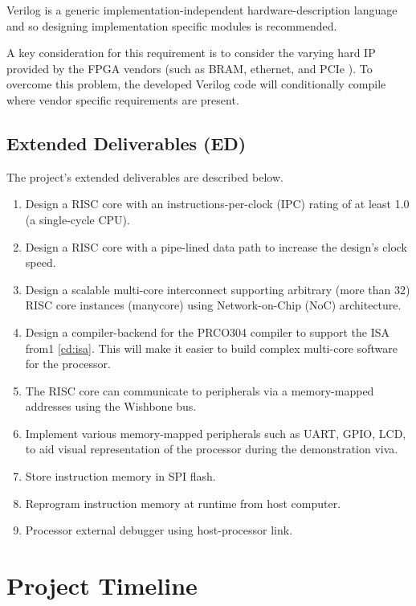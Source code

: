 \begin{enumerate}[leftmargin=2\parindent, label=\bfseries CD\arabic*]
{Verilog is a generic implementation-independent hardware-description language and so designing implementation specific modules is recommended.

A key consideration for this requirement is to consider the varying hard IP provided by the FPGA vendors (such as BRAM, ethernet, and PCIe \cite{xilinxbram,alterabram}). To overcome this problem, the developed Verilog code will conditionally compile where vendor specific requirements are present.
}\label{cd:vendor}
\end{enumerate}

\subsection{Extended Deliverables (ED)}
The project's extended deliverables are described below.
\begin{enumerate}[leftmargin=2\parindent, label=\bfseries ED\arabic*]
    \item{Design a RISC core with an instructions-per-clock (IPC) rating of at least 1.0 (a single-cycle CPU).}
\label{ed:ipc}
    \item{Design a RISC core with a pipe-lined data path to increase the design's clock speed.}\label{ed:pipeline}
    \item{Design a scalable multi-core interconnect supporting arbitrary (more than 32) RISC core instances (manycore) using Network-on-Chip (NoC) architecture.}\label{ed:scale}
    \item{Design a compiler-backend for the PRCO304 \cite{prco304} compiler to support the ISA from1 \ref{cd:isa}. This will make it easier to build complex multi-core software for the processor.}\label{ed:compiler}
    \item{The RISC core can communicate to peripherals via a memory-mapped addresses using the Wishbone bus.}\label{ed:mmu}
    \item{Implement various memory-mapped peripherals such as UART, GPIO, LCD, to aid visual representation of the processor during the demonstration viva.}\label{ed:peripherals} 
    \item{Store instruction memory in SPI flash.}\label{ed:flash}
    \item{Reprogram instruction memory at runtime from host computer.}\label{ed:program}
    \item{Processor external debugger using host-processor link.}\label{ed:debug}
\end{enumerate}

\section{Project Timeline}
\label{sect:timeline}
